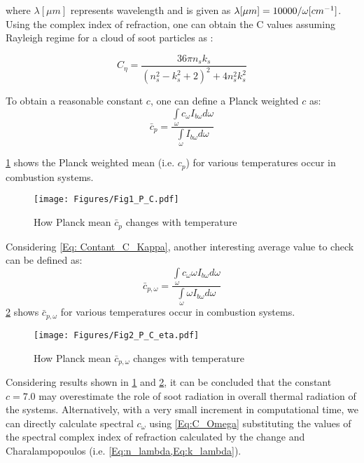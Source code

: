 \documentclass[3p]{elsarticle}
\begin{document}
where \({\lambda [\mu m]}\) represents wavelength and is given as \(\lambda [\mu m] = {{10000} \mathord{\left/
		{\vphantom {{10000} \omega }} \right.
		\kern-\nulldelimiterspace} \omega }[c{m^{ - 1}}]\).
Using the complex index of refraction, one can obtain the C values assuming Rayleigh regime for a cloud of soot particles as \cite{modest2013radiative,ChangeCharalampopoulos1990}:

\begin{equation}
C_\eta=\frac{36\pi n_s k_s}{(n_s^2-k_s^2+2)^2+4 n_s^2 k_s^2}
\label{Eq:C_Omega}
\end{equation}

To obtain a reasonable constant  \(c\), one can define a Planck weighted \(c\) as:
\begin{equation}
{\bar c_p} = \frac{{\int\limits_\omega  {{c_\omega }{I_{b\omega }}d\omega } }}{{\int\limits_\omega  {{I_{b\omega }}d\omega } }}
\end{equation}

\cref{Fig: PlanckWeightedC} shows the Planck weighted mean (i.e. \(c_p\)) for various temperatures occur in combustion systems.

\begin{figure}[h!]
			\centering\texttt{[image: Figures/Fig1\_P\_C.pdf]}
			\caption{How  Planck  mean  \({\bar c_p}\)  changes  with  temperature}
			\label{Fig: PlanckWeightedC}
\end{figure}
Considering \cref{Eq: Contant_C_Kappa}, another interesting average value to check can be defined as:
\begin{equation}
{\bar c_{p,\omega }} = \frac{{\int\limits_\omega  {{c_\omega }\omega {I_{b\omega }}d\omega } }}{{\int\limits_\omega  {\omega {I_{b\omega }}d\omega } }}
\end{equation}
\cref{Fig: PlanckWeightedCEta} shows \(\bar c_{p,\omega }\) for various temperatures occur in combustion systems.
  
\begin{figure}
	\centering\texttt{[image: Figures/Fig2\_P\_C\_eta.pdf]}
	\caption{How  Planck  mean  \({\bar c_{p,\omega }}\)  changes  with  temperature}
	\label{Fig: PlanckWeightedCEta}
\end{figure}
Considering results shown in  \cref{Fig: PlanckWeightedC} and \cref{Fig: PlanckWeightedCEta}, it can be concluded that the constant \(c = 7.0\) may overestimate the role of soot radiation in overall thermal radiation of the systems. Alternatively, with a very small increment in computational time, we can directly calculate spectral  \(c_\omega\) using \cref{Eq:C_Omega} substituting the values of the spectral complex index of refraction calculated by the change and  Charalampopoulos \cite{ChangeCharalampopoulos1990} (i.e. \cref{Eq:n_lambda,Eq:k_lambda}).
\end{document}
